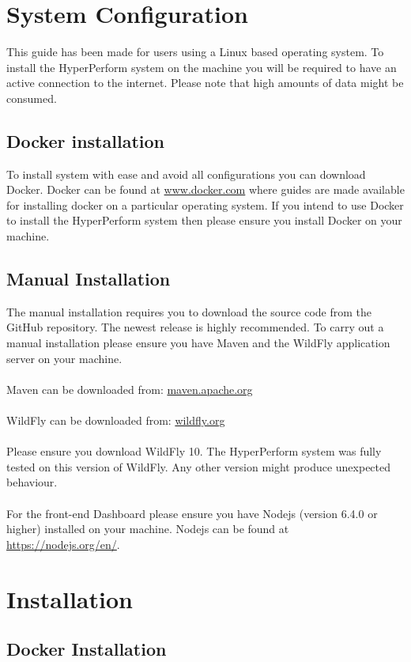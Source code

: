 \documentclass[11pt,a4paper]{article}
\begin{document}
\section{System Configuration}
This guide has been made for users using a Linux based operating system. To install the HyperPerform system on the machine you will be required to have an active connection to the internet. Please note that high amounts of data might be consumed. 

\subsection{Docker installation}
To install system with ease and avoid all configurations you can download Docker. Docker can be found at \url{www.docker.com} where guides are made available for installing docker on a particular operating system. If you intend to use Docker to install the HyperPerform system then please ensure you install Docker on your machine.

\subsection{Manual Installation}
The manual installation requires you to download the source code from the GitHub repository. The newest release is highly recommended. To carry out a manual installation please ensure you have Maven and the WildFly application server on your machine. \\ \\
Maven can be downloaded from: \url{maven.apache.org} \\ \\
WildFly can be downloaded from: \url{wildfly.org} \\ \\
Please ensure you download WildFly 10. The HyperPerform system was fully tested on this version of WildFly. Any other version might produce unexpected behaviour. \\ \\
For the front-end Dashboard please ensure you have Nodejs (version 6.4.0 or higher) installed on your machine. Nodejs can be found at \url{https://nodejs.org/en/}.

\section{Installation}

\subsection{Docker Installation}
\end{document}
